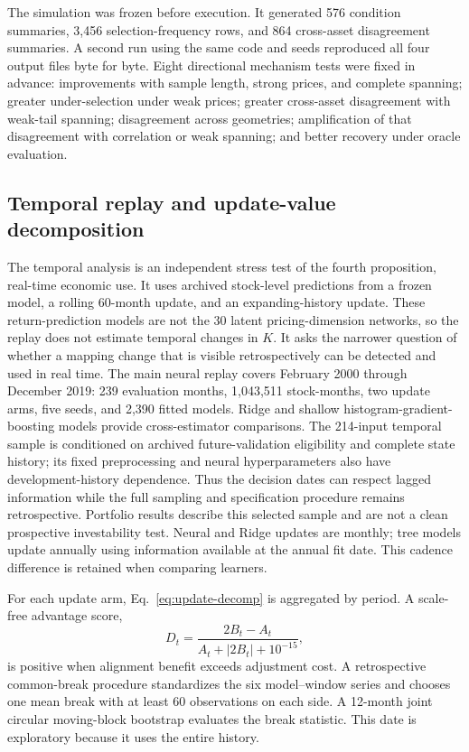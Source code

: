 The simulation was frozen before execution. It generated 576 condition summaries, 3,456 selection-frequency rows, and 864 cross-asset disagreement summaries. A second run using the same code and seeds reproduced all four output files byte for byte. Eight directional mechanism tests were fixed in advance: improvements with sample length, strong prices, and complete spanning; greater under-selection under weak prices; greater cross-asset disagreement with weak-tail spanning; disagreement across geometries; amplification of that disagreement with correlation or weak spanning; and better recovery under oracle evaluation.

\subsection{Temporal replay and update-value decomposition}

The temporal analysis is an independent stress test of the fourth proposition, real-time economic use. It uses archived stock-level predictions from a frozen model, a rolling 60-month update, and an expanding-history update. These return-prediction models are not the 30 latent pricing-dimension networks, so the replay does not estimate temporal changes in $K$. It asks the narrower question of whether a mapping change that is visible retrospectively can be detected and used in real time. The main neural replay covers February 2000 through December 2019: 239 evaluation months, 1,043,511 stock-months, two update arms, five seeds, and 2,390 fitted models. Ridge and shallow histogram-gradient-boosting models provide cross-estimator comparisons. The 214-input temporal sample is conditioned on archived future-validation eligibility and complete state history; its fixed preprocessing and neural hyperparameters also have development-history dependence. Thus the decision dates can respect lagged information while the full sampling and specification procedure remains retrospective. Portfolio results describe this selected sample and are not a clean prospective investability test. Neural and Ridge updates are monthly; tree models update annually using information available at the annual fit date. This cadence difference is retained when comparing learners.

For each update arm, Eq.~\eqref{eq:update-decomp} is aggregated by period. A scale-free advantage score,
\begin{equation}
 D_t=\frac{2B_t-A_t}{A_t+|2B_t|+10^{-15}},
\end{equation}
is positive when alignment benefit exceeds adjustment cost. A retrospective common-break procedure standardizes the six model--window series and chooses one mean break with at least 60 observations on each side. A 12-month joint circular moving-block bootstrap evaluates the break statistic. This date is exploratory because it uses the entire history.

